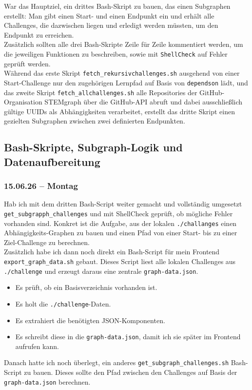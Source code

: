 War das Hauptziel, ein drittes Bash-Skript zu bauen, das einen Subgraphen erstellt:
Man gibt einen Start- und einen Endpunkt ein und erhält alle Challenges, die
dazwischen liegen und erledigt werden müssten, um den Endpunkt zu erreichen.
\\
Zusätzlich sollten alle drei Bash-Skripte Zeile für Zeile kommentiert werden, um
die jeweiligen Funktionen zu beschreiben, sowie mit \texttt{ShellCheck} auf Fehler
geprüft werden.
\\
Während das erste Skript \texttt{fetch\_rekursivchallenges.sh} ausgehend von einer
Start-Challenge nur den zugehörigen Lernpfad auf Basis von \texttt{dependson} lädt,
und das zweite Skript \texttt{fetch\_allchallenges.sh} alle Repositories der
GitHub-Organisation STEMgraph über die GitHub-API abruft und dabei ausschließlich
gültige UUIDs als Abhängigkeiten verarbeitet, erstellt das dritte Skript einen
gezielten Subgraphen zwischen zwei definierten Endpunkten.

\subsection{Bash-Skripte, Subgraph-Logik und Datenaufbereitung}
\subsubsection{15.06.26 -- Montag}

Hab ich mit dem dritten Bash-Script weiter gemacht und vollständig umgesetzt \texttt{get\_subgrapph\_challenges} und mit ShellCheck geprüft, ob mögliche Fehler vorhanden sind.
Konkret ist die Aufgabe, aus der lokalen \texttt{./challanges} einen Abhängigkeits-Graphen zu bauen und einen Pfad von einer Start- bis zu einer Ziel-Challenge zu berechnen.
\\
Zusätzlich habe ich dann noch direkt ein Bash-Script für mein Frontend \texttt{export\_graph\_data.sh} gebaut.
Dieses Script liest alle lokalen Challenges aus \texttt{./challenge} und erzeugt daraus eine zentrale \texttt{graph-data.json}.

\begin{itemize}[itemsep=2pt, topsep=4pt]
    \item Es prüft, ob ein Basisverzeichnis vorhanden ist.
    \item Es holt die \texttt{./challenge}-Daten.
    \item Es extrahiert die benötigten JSON-Komponenten.
    \item Es schreibt diese in die \texttt{graph-data.json}, damit ich sie später im Frontend aufrufen kann.
\end{itemize}
Danach hatte ich noch überlegt, ein anderes \texttt{get\_subgraph\_challenges.sh} Bash-Script zu bauen.
Dieses sollte den Pfad zwischen den Challenges auf Basis der \texttt{graph-data.json} berechnen.

